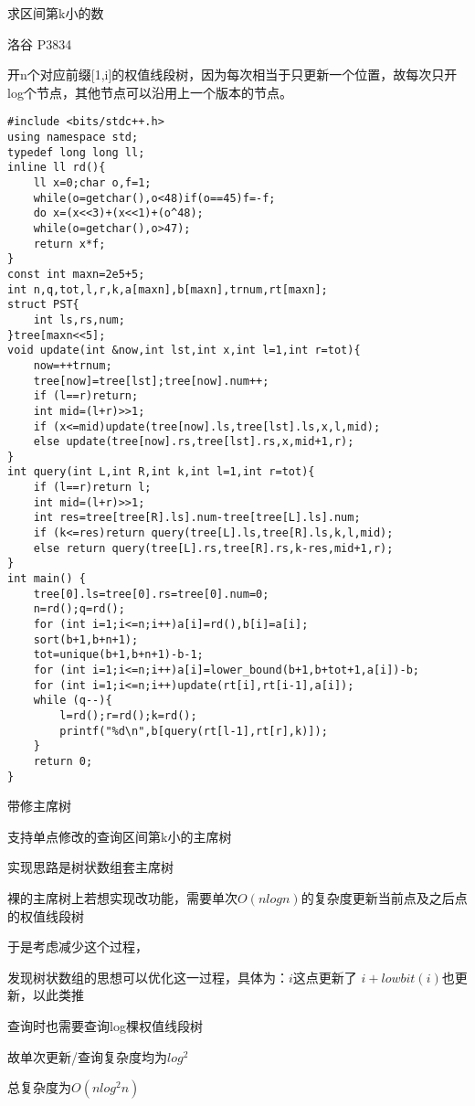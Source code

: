 \documentclass[12pt]{article}
\begin{document}
{{{{{{{{{{求区间第k小的数

洛谷 P3834

开n个对应前缀[1,i]的权值线段树，因为每次相当于只更新一个位置，故每次只开log个节点，其他节点可以沿用上一个版本的节点。

{\setmainfont{Consolas}
\begin{lstlisting}
#include <bits/stdc++.h>
using namespace std;
typedef long long ll;
inline ll rd(){
    ll x=0;char o,f=1;
    while(o=getchar(),o<48)if(o==45)f=-f;
    do x=(x<<3)+(x<<1)+(o^48);
    while(o=getchar(),o>47);
    return x*f;
}
const int maxn=2e5+5;
int n,q,tot,l,r,k,a[maxn],b[maxn],trnum,rt[maxn];
struct PST{
    int ls,rs,num;
}tree[maxn<<5];
void update(int &now,int lst,int x,int l=1,int r=tot){
    now=++trnum;
    tree[now]=tree[lst];tree[now].num++;
    if (l==r)return;
    int mid=(l+r)>>1;
    if (x<=mid)update(tree[now].ls,tree[lst].ls,x,l,mid);
    else update(tree[now].rs,tree[lst].rs,x,mid+1,r);
}
int query(int L,int R,int k,int l=1,int r=tot){
    if (l==r)return l;
    int mid=(l+r)>>1;
    int res=tree[tree[R].ls].num-tree[tree[L].ls].num;
    if (k<=res)return query(tree[L].ls,tree[R].ls,k,l,mid);
    else return query(tree[L].rs,tree[R].rs,k-res,mid+1,r);
}
int main() {
    tree[0].ls=tree[0].rs=tree[0].num=0;
    n=rd();q=rd();
    for (int i=1;i<=n;i++)a[i]=rd(),b[i]=a[i];
    sort(b+1,b+n+1);
    tot=unique(b+1,b+n+1)-b-1;
    for (int i=1;i<=n;i++)a[i]=lower_bound(b+1,b+tot+1,a[i])-b;
    for (int i=1;i<=n;i++)update(rt[i],rt[i-1],a[i]);
    while (q--){
        l=rd();r=rd();k=rd();
        printf("%d\n",b[query(rt[l-1],rt[r],k)]);
    }
    return 0;
}

\end{lstlisting}



带修主席树

支持单点修改的查询区间第k小的主席树

实现思路是树状数组套主席树

裸的主席树上若想实现改功能，需要单次$O(nlogn)$的复杂度更新当前点及之后点的权值线段树

于是考虑减少这个过程，

发现树状数组的思想可以优化这一过程，具体为：$i$这点更新了 $i+lowbit(i)$也更新，以此类推

查询时也需要查询log棵权值线段树

故单次更新/查询复杂度均为$log^2$

总复杂度为$O(nlog^2n)$

}}}}}}}}}}}
\end{document}
